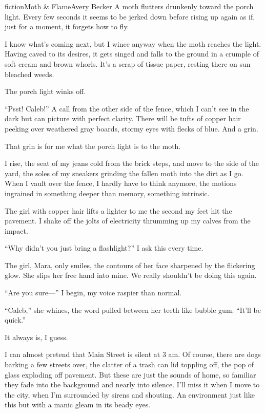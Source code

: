 \begin{prose}{fiction}{Moth \& Flame}{Avery Becker}
A moth flutters drunkenly toward the porch light. Every few seconds it seems to be jerked down before rising up again as if, just for a moment, it forgets how to fly.\par
I know what's coming next, but I wince anyway when the moth reaches the light. Having caved to its desires, it gets singed and falls to the ground in a crumple of soft cream and brown whorls. It's a scrap of tissue paper, resting there on sun bleached weeds.\par
The porch light winks off.\par
“Psst! Caleb!” A call from the other side of the fence, which I can't see in the dark but can picture with perfect clarity. There will be tufts of copper hair peeking over weathered gray boards, stormy eyes with flecks of blue. And a grin. \par
That grin is for me what the porch light is to the moth. \par
I rise, the seat of my jeans cold from the brick steps, and move to the side of the yard, the soles of my sneakers grinding the fallen moth into the dirt as I go. When I vault over the fence, I hardly have to think anymore, the motions ingrained in something deeper than memory, something intrinsic. \par
The girl with copper hair lifts a lighter to me the second my feet hit the pavement. I shake off the jolts of electricity thrumming up my calves from the impact.\par
“Why didn't you just bring a flashlight?” I ask this every time.\par
The girl, Mara, only smiles, the contours of her face sharpened by the flickering glow. She slips her free hand into mine. We really shouldn't be doing this again.\par
“Are you sure—” I begin, my voice raspier than normal.\par
“Caleb,” she whines, the word pulled between her teeth like bubble gum. “It'll be quick.” \par
It always is, I guess.\par
I can almost pretend that Main Street is silent at 3 am. Of course, there are dogs barking a few streets over, the clatter of a trash can lid toppling off, the pop of glass exploding off pavement. But these are just the sounds of home, so familiar they fade into the background and nearly into silence. I'll miss it when I move to the city, when I'm surrounded by sirens and shouting. An environment just like this but with a manic gleam in its beady eyes.\par

\end{prose}
